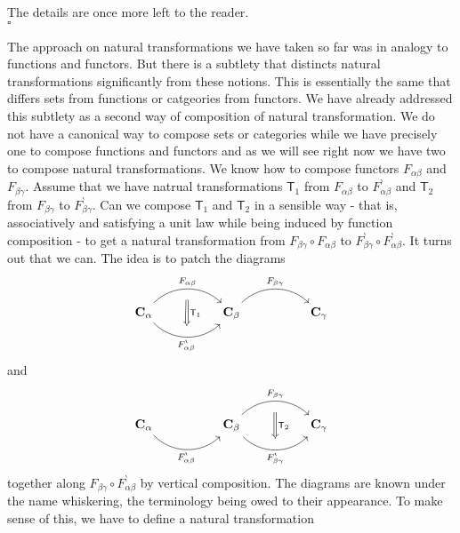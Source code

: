 \begin{prf}
The details are once more left to the reader.
\\
\phantom{proven}
\hfill
$\square$
\end{prf}
The approach on natural transformations we have taken so far was in analogy to functions and functors. But there is a subtlety that distincts natural transformations significantly from these notions. This is essentially the same that differs sets from functions or catgeories from functors. We have already addressed this subtlety as a second way of composition of natural transformation. We do not have a canonical way to compose sets or categories while we have precisely one to compose functions and functors and as we will see right now we have two to compose natural transformations. We know how to compose functors $F_{\alpha\beta}$ and $F_{\beta\gamma}$. Assume that we have natrual transformations $\mathsf{T}_{1}$ from $F_{\alpha\beta}$ to $F_{\alpha\beta}^{\backprime}$ and $\mathsf{T}_{2}$ from $F_{\beta\gamma}$ to $F_{\beta\gamma}^{\backprime}$. Can we compose $\mathsf{T}_{1}$ and $\mathsf{T}_{2}$ in a sensible way - that is, associatively and satisfying a unit law while being induced by function composition - to get a natural transformation from $F_{\beta\gamma} \circ F_{\alpha\beta}$ to $F_{\beta\gamma}^{\backprime} \circ F_{\alpha\beta}^{\backprime}$. It turns out that we can. The idea is to patch the diagrams
\[
\begin{tikzcd}[sep=huge]
  \mathbf{C}_{\alpha}
  \arrow[bend left=45]{r}[name=fab]{F_{\alpha\beta}}
  \arrow[bend right=45,swap]{r}[name=fab*]{F_{\alpha\beta}^{\backprime}}
  &
  \mathbf{C}_{\beta}
  \arrow[bend left=45]{r}{F_{\beta\gamma}}
  &
  \mathbf{C}_{\gamma}
  \arrow[from=fab,to=fab*,shorten <= 9pt,shorten >= 9pt,Rightarrow]{d}{\mathsf{T}_{1}}
\end{tikzcd}
\]
and
\[
\begin{tikzcd}[sep=huge]
  \mathbf{C}_{\alpha}
  \arrow[bend right=45,swap]{r}{F_{\alpha\beta}^{\backprime}}
  &
  \mathbf{C}_{\beta}
  \arrow[bend left=45]{r}[name=fcd]{F_{\beta\gamma}}
  \arrow[bend right=45,swap]{r}[name=fcd*]{F_{\beta\gamma}^{\backprime}}
  &
  \mathbf{C}_{\gamma}
  \arrow[from=fcd,to=fcd*,shorten <= 9pt,shorten >= 9pt,Rightarrow]{d}{\mathsf{T}_{2}}
\end{tikzcd}
\]
together along $F_{\beta\gamma} \circ F_{\alpha\beta}^{\backprime}$ by vertical composition. The diagrams are known under the name whiskering, the terminology being owed to their appearance. To make sense of this, we have to define a natural transformation
